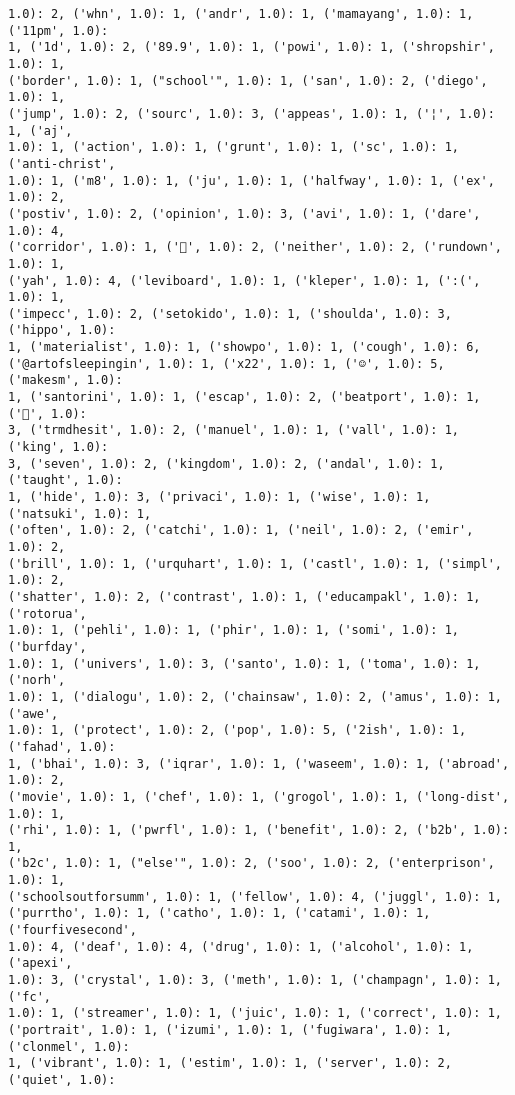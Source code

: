 \documentclass[11pt]{article}
\begin{document}
\begin{Verbatim}[commandchars=\\\{\}]
1.0): 2, ('whn', 1.0): 1, ('andr', 1.0): 1, ('mamayang', 1.0): 1, ('11pm', 1.0):
1, ('1d', 1.0): 2, ('89.9', 1.0): 1, ('powi', 1.0): 1, ('shropshir', 1.0): 1,
('border', 1.0): 1, ("school'", 1.0): 1, ('san', 1.0): 2, ('diego', 1.0): 1,
('jump', 1.0): 2, ('sourc', 1.0): 3, ('appeas', 1.0): 1, ('¦', 1.0): 1, ('aj',
1.0): 1, ('action', 1.0): 1, ('grunt', 1.0): 1, ('sc', 1.0): 1, ('anti-christ',
1.0): 1, ('m8', 1.0): 1, ('ju', 1.0): 1, ('halfway', 1.0): 1, ('ex', 1.0): 2,
('postiv', 1.0): 2, ('opinion', 1.0): 3, ('avi', 1.0): 1, ('dare', 1.0): 4,
('corridor', 1.0): 1, ('👯', 1.0): 2, ('neither', 1.0): 2, ('rundown', 1.0): 1,
('yah', 1.0): 4, ('leviboard', 1.0): 1, ('kleper', 1.0): 1, (':(', 1.0): 1,
('impecc', 1.0): 2, ('setokido', 1.0): 1, ('shoulda', 1.0): 3, ('hippo', 1.0):
1, ('materialist', 1.0): 1, ('showpo', 1.0): 1, ('cough', 1.0): 6,
('@artofsleepingin', 1.0): 1, ('x22', 1.0): 1, ('☺', 1.0): 5, ('makesm', 1.0):
1, ('santorini', 1.0): 1, ('escap', 1.0): 2, ('beatport', 1.0): 1, ('🏻', 1.0):
3, ('trmdhesit', 1.0): 2, ('manuel', 1.0): 1, ('vall', 1.0): 1, ('king', 1.0):
3, ('seven', 1.0): 2, ('kingdom', 1.0): 2, ('andal', 1.0): 1, ('taught', 1.0):
1, ('hide', 1.0): 3, ('privaci', 1.0): 1, ('wise', 1.0): 1, ('natsuki', 1.0): 1,
('often', 1.0): 2, ('catchi', 1.0): 1, ('neil', 1.0): 2, ('emir', 1.0): 2,
('brill', 1.0): 1, ('urquhart', 1.0): 1, ('castl', 1.0): 1, ('simpl', 1.0): 2,
('shatter', 1.0): 2, ('contrast', 1.0): 1, ('educampakl', 1.0): 1, ('rotorua',
1.0): 1, ('pehli', 1.0): 1, ('phir', 1.0): 1, ('somi', 1.0): 1, ('burfday',
1.0): 1, ('univers', 1.0): 3, ('santo', 1.0): 1, ('toma', 1.0): 1, ('norh',
1.0): 1, ('dialogu', 1.0): 2, ('chainsaw', 1.0): 2, ('amus', 1.0): 1, ('awe',
1.0): 1, ('protect', 1.0): 2, ('pop', 1.0): 5, ('2ish', 1.0): 1, ('fahad', 1.0):
1, ('bhai', 1.0): 3, ('iqrar', 1.0): 1, ('waseem', 1.0): 1, ('abroad', 1.0): 2,
('movie', 1.0): 1, ('chef', 1.0): 1, ('grogol', 1.0): 1, ('long-dist', 1.0): 1,
('rhi', 1.0): 1, ('pwrfl', 1.0): 1, ('benefit', 1.0): 2, ('b2b', 1.0): 1,
('b2c', 1.0): 1, ("else'", 1.0): 2, ('soo', 1.0): 2, ('enterprison', 1.0): 1,
('schoolsoutforsumm', 1.0): 1, ('fellow', 1.0): 4, ('juggl', 1.0): 1,
('purrtho', 1.0): 1, ('catho', 1.0): 1, ('catami', 1.0): 1, ('fourfivesecond',
1.0): 4, ('deaf', 1.0): 4, ('drug', 1.0): 1, ('alcohol', 1.0): 1, ('apexi',
1.0): 3, ('crystal', 1.0): 3, ('meth', 1.0): 1, ('champagn', 1.0): 1, ('fc',
1.0): 1, ('streamer', 1.0): 1, ('juic', 1.0): 1, ('correct', 1.0): 1,
('portrait', 1.0): 1, ('izumi', 1.0): 1, ('fugiwara', 1.0): 1, ('clonmel', 1.0):
1, ('vibrant', 1.0): 1, ('estim', 1.0): 1, ('server', 1.0): 2, ('quiet', 1.0):

\end{Verbatim}
\end{document}
